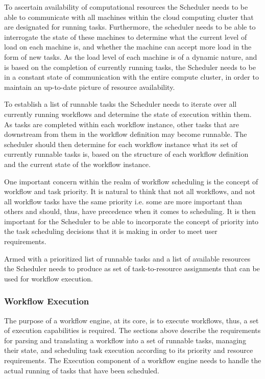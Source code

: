 To ascertain availability of computational resources the Scheduler needs to be able to communicate with all machines within the cloud computing cluster that are designated for running tasks. Furthermore, the scheduler needs to be able to interrogate the state of these machines to determine what the current level of load on each machine is, and whether the machine can accept more load in the form of new tasks. As the load level of each machine is of a dynamic nature, and is based on the completion of currently running tasks, the Scheduler needs to be in a constant state of communication with the entire compute cluster, in order to maintain an up-to-date picture of resource availability.

To establish a list of runnable tasks the Scheduler needs to iterate over all currently running workflows and determine the state of execution within them. As tasks are completed within each workflow instance, other tasks that are downstream from them in the workflow definition may become runnable. The scheduler should then determine for each workflow instance what its set of currently runnable tasks is, based on the structure of each workflow definition and the current state of the workflow instance.

One important concern within the realm of workflow scheduling is the concept of workflow and task priority. It is natural to think that not all workflows, and not all workflow tasks have the same priority i.e. some are more important than others and should, thus, have precedence when it comes to scheduling. It is then important for the Scheduler to be able to incorporate the concept of priority into the task scheduling decisions that it is making in order to meet user requirements.

Armed with a prioritized list of runnable tasks and a list of available resources the Scheduler needs to produce as set of task-to-resource assignments that can be used for workflow execution.

\subsubsection {Workflow Execution} 

The purpose of a workflow engine, at its core, is to execute workflows, thus, a set of execution capabilities is required. The sections above describe the requirements for parsing and translating a workflow into a set of runnable tasks, managing their state, and scheduling task execution according to its priority and resource requirements. The Execution component of a workflow engine needs to handle the actual running of tasks that have been scheduled.

